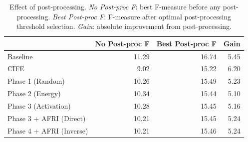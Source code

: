 \begin{table}
\centering
\caption{Effect of post-processing. \emph{No Post-proc F}: best F-measure before any post-processing. \emph{Best Post-proc F}: F-measure after optimal post-processing threshold selection. \emph{Gain}: absolute improvement from post-processing.}
\label{tab:postproc_effect}
\begin{tabular}{lrrr}
\toprule
{} &  No Post-proc F &  Best Post-proc F &  Gain \\
\midrule
Baseline                 &           11.29 &             16.74 &  5.45 \\
CIFE                     &            9.02 &             15.22 &  6.20 \\
Phase 1 (Random)         &           10.26 &             15.49 &  5.23 \\
Phase 2 (Energy)         &           10.34 &             15.44 &  5.10 \\
Phase 3 (Activation)     &           10.28 &             15.45 &  5.16 \\
Phase 3 + AFRI (Direct)  &           10.21 &             15.45 &  5.24 \\
Phase 4 + AFRI (Inverse) &           10.21 &             15.46 &  5.24 \\
\bottomrule
\end{tabular}
\end{table}
